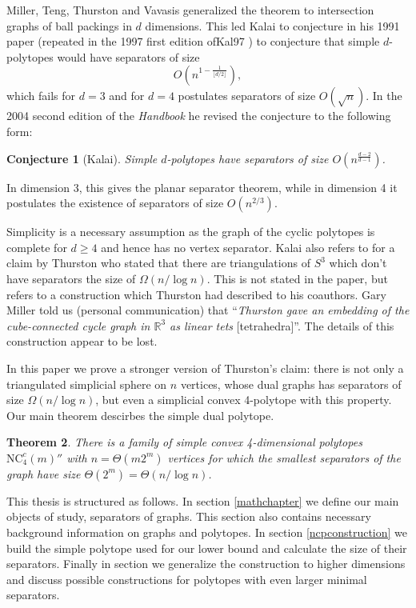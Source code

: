 \documentclass[a4paper,12pt]{book}
\theoremstyle{plain}
\newtheorem{theorem}{Theorem}[section]
\newtheorem{conjecture}[theorem]{Conjecture}
\theoremstyle{definition}
\newcommand\NCC{\mathrm{NC}^c}
\begin{document}
Miller, Teng, Thurston and Vavasis \cite{MillerTengThurstonVavasis} generalized 
the theorem to intersection graphs of ball packings in $d$ dimensions. This 
led Kalai to conjecture in his 1991 paper \cite[Conj 12.1.]{Ka2}(repeated in the 1997 first edition of{Kal97} ) to conjecture that 
simple $d$-polytopes would have separators of size
\begin{equation}
O\left(n^{1-\frac{1}{\lfloor d/2 \rfloor}}\right),
\end{equation}
which fails for $d=3$ and for $d=4$ postulates separators of size $O(\sqrt{n})$. In the 2004 second edition of
the \textit{Handbook} \cite[Conj. 20.2.12]{kalai04:_polyt} he revised the conjecture to the following form:
\begin{conjecture}[Kalai]
\label{simpleconjecture}
Simple $d$-polytopes have separators of size
$O \left(n^{\frac{d-2}{d-1}}\right)$.
\end{conjecture}
In dimension 3, this gives the planar separator theorem, while in dimension 4 it postulates the existence
of separators of size $O(n^{2/3}).$

Simplicity is a necessary assumption as the graph of the cyclic polytopes is complete for 
$d\geq 4$ and hence has no vertex separator. Kalai also refers to 
\cite{MillerTengThurstonVavasis} for a claim by Thurston who stated that there are triangulations of 
$S^3$ which don't have separators the size of $\Omega(n/\log n)$. This is not 
stated in the paper, but refers to a construction which Thurston had described to his 
coauthors. Gary Miller told us (personal communication) that 
“\textit{Thurston gave an embedding of the cube-connected cycle graph in $\mathbb{R}^3$
as linear tets} [tetrahedra]”. The details of this construction appear to be lost.

In this paper we prove a stronger version of Thurston's claim: there is not only a triangulated simplicial sphere
on $n$ vertices, whose dual graphs has separators of size $\Omega(n/\log n)$, but even a simplicial convex 4-polytope
with this property. Our main theorem descirbes the simple dual polytope.

\begin{theorem}
There is a family of simple convex 4-dimensional polytopes $\NCC_4(m)''$ with $n=\Theta(m 2^m)$ vertices for which
the smallest separators of the graph have size $\Theta(2^m) = \Theta(n/\log n)$.
\end{theorem}

This thesis is structured as follows. In section \ref{mathchapter} we define our main objects of study,
separators of graphs. This section also contains necessary background information on 
graphs and polytopes. In section \ref{ncpconstruction} we build the simple polytope used for our 
lower bound and calculate the size of their separators. Finally in section \label{genes} we generalize
the construction to higher dimensions and discuss possible constructions for polytopes with even larger
minimal separators.
\end{document}
